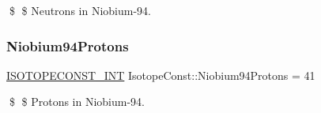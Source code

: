 \$ \$ Neutrons in Niobium-\/94. \mbox{\label{group___isotope_const-_niobium-_nb94_ga5ba96555ea2964081b61f6977e267edc}} 
\subsubsection{\texorpdfstring{Niobium94\+Protons}{Niobium94Protons}}
{\footnotesize\ttfamily \mbox{\hyperlink{group___isotope_const-_macros_ga5f18360b3e99483a35c32d789e62621c}{I\+S\+O\+T\+O\+P\+E\+C\+O\+N\+S\+T\+\_\+\+I\+NT}} Isotope\+Const\+::\+Niobium94\+Protons = 41}

\$ \$ Protons in Niobium-\/94. 